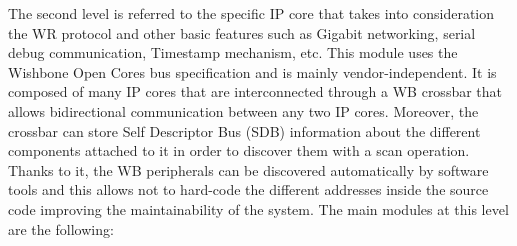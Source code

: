 \documentclass[review]{elsarticle}
\begin{document}
The second level is referred to the specific IP core that takes into consideration the WR protocol and other basic features such as Gigabit networking, serial debug communication, Timestamp mechanism, etc. This module uses the Wishbone Open Cores bus specification and is mainly vendor-independent. It is composed of many IP cores that are interconnected through a WB crossbar that allows bidirectional communication between any two IP cores. Moreover, the crossbar can store Self Descriptor Bus (SDB) information about the different components attached to it in order to discover them with a scan operation. Thanks to it, the WB peripherals can be discovered automatically by software tools and this allows not to hard-code the different addresses inside the source code improving the maintainability of the system. The main modules at this level are the following:

\end{document}
